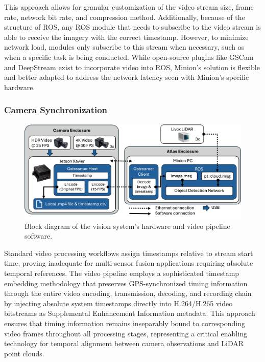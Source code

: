 \documentclass{erauthesis}
\begin{document}
This approach allows for granular customization of the video stream size, frame rate, network bit rate, and compression method. 
Additionally, because of the structure of ROS, any ROS module that needs to subscribe to the video stream is able to receive the imagery with the correct timestamp. However, to minimize network load, modules only subscribe to this stream when necessary, such as when a specific task is being conducted. 
While open-source plugins like GSCam \cite{GSCam} and DeepStream \cite{deepstream} exist to incorporate video into ROS, Minion's solution is flexible and better adapted to address the network latency seen with Minion's specific hardware.


\subsubsection{Camera Synchronization} \label{time_sync_cam}

\begin{figure}[h]
\centering
\includegraphics[width=5in]{Images/Video_Block_Diagram.png}
\caption{Block diagram of the vision system's hardware and video pipeline software.}
\label{video_pipeline}
\end{figure}


Standard video processing workflows assign timestamps relative to stream start time, proving inadequate for multi-sensor fusion applications requiring absolute temporal references.
The video pipeline employs a sophisticated timestamp embedding methodology that preserves GPS-synchronized timing information through the entire video encoding, transmission, decoding, and recording chain by injecting absolute system timestamps directly into H.264/H.265 video bitstreams as Supplemental Enhancement Information metadata.
This approach ensures that timing information remains inseparably bound to corresponding video frames throughout all processing stages, representing a critical enabling technology for temporal alignment between camera observations and LiDAR point clouds.
\end{document}
